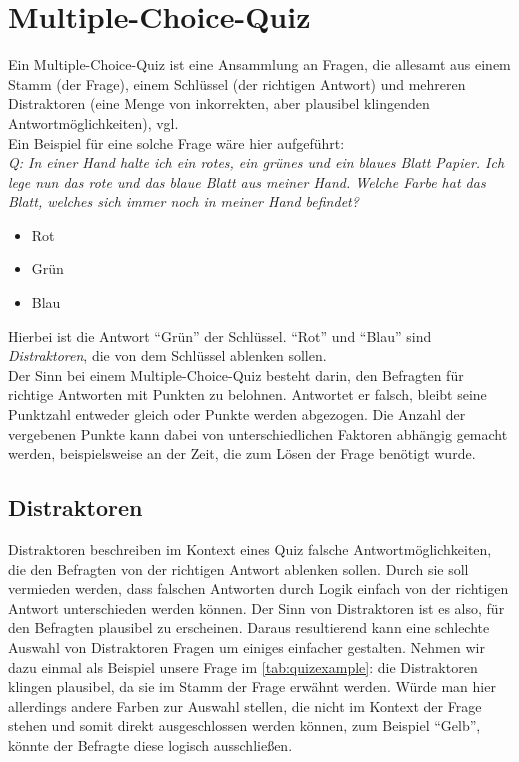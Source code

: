 \documentclass[headsepline,titlepage,ngerman,twoside,12pt]{report}
\newcommand\todo[1]{}%
\begin{document}
\section{Multiple-Choice-Quiz}
\label{sec:quiz}
Ein Multiple-Choice-Quiz ist eine Ansammlung an Fragen, die allesamt aus einem Stamm (der Frage), einem Schlüssel (der richtigen Antwort) und mehreren Distraktoren (eine Menge von inkorrekten, aber plausibel klingenden Antwortmöglichkeiten), vgl. \todo{Quelle mit citet zitieren}
\\Ein Beispiel für eine solche Frage wäre hier aufgeführt:
\\\textit{Q: In einer Hand halte ich ein rotes, ein grünes und ein blaues Blatt Papier. Ich lege nun das rote und das blaue Blatt aus meiner Hand. Welche Farbe hat das Blatt, welches sich immer noch in meiner Hand befindet?}
\label{tab:quizexample}
\begin{itemize}
    \item Rot
    \item Grün
    \item Blau
\end{itemize}
Hierbei ist die Antwort \enquote{Grün} der Schlüssel. \enquote{Rot} und \enquote{Blau} sind \textit{Distraktoren}, die von dem Schlüssel ablenken sollen.
\\Der Sinn bei einem Multiple-Choice-Quiz besteht darin, den Befragten für richtige Antworten mit Punkten zu belohnen. Antwortet er falsch, bleibt seine Punktzahl entweder gleich oder Punkte werden abgezogen. Die Anzahl der vergebenen Punkte kann dabei von unterschiedlichen Faktoren abhängig gemacht werden, beispielsweise an der Zeit, die zum Lösen der Frage benötigt wurde.
\subsection{Distraktoren}
\label{sub:distraktoren}
Distraktoren beschreiben im Kontext eines Quiz falsche Antwortmöglichkeiten, die den Befragten von der richtigen Antwort ablenken sollen.
Durch sie soll vermieden werden, dass falschen Antworten durch Logik einfach von der richtigen Antwort unterschieden werden können. Der Sinn von Distraktoren ist es also, für den Befragten plausibel zu erscheinen.
Daraus resultierend kann eine schlechte Auswahl von Distraktoren Fragen um einiges einfacher gestalten. Nehmen wir dazu einmal als Beispiel unsere Frage im \cref{tab:quizexample}:
die Distraktoren klingen plausibel, da sie im Stamm der Frage erwähnt werden. Würde man hier allerdings andere Farben zur Auswahl stellen, die nicht im Kontext der Frage stehen und somit direkt ausgeschlossen werden können, zum Beispiel \enquote{Gelb}, könnte der Befragte diese logisch ausschließen.
\end{document}
